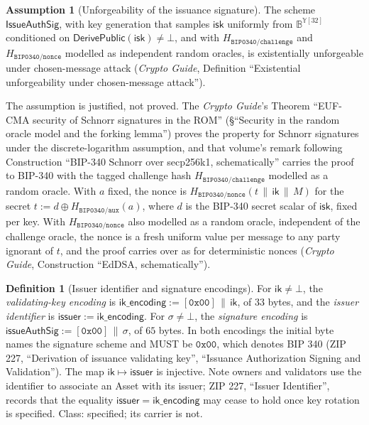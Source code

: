 \documentclass[11pt,a4paper]{article}
\theoremstyle{definition}
\newtheorem{definition}[theorem]{Definition}
\newtheorem{assumption}[theorem]{Assumption}
\begin{document}
\begin{assumption}[Unforgeability of the issuance signature]
\label{ass:issueauthsig-euf}
The scheme $\mathsf{IssueAuthSig}$, with key generation that samples
$\mathsf{isk}$ uniformly from $\mathbb{B}^{\mathbb{Y}[32]}$ conditioned on
$\mathsf{DerivePublic}(\mathsf{isk}) \neq \bot$, and with
$H_{\mathtt{BIP0340/challenge}}$ and $H_{\mathtt{BIP0340/nonce}}$ modelled
as independent random oracles, is existentially unforgeable under chosen-message
attack (\emph{Crypto Guide}, Definition
``Existential unforgeability under chosen-message attack'').
\end{assumption}

The assumption is justified, not proved. The \emph{Crypto Guide}'s Theorem
``EUF-CMA security of Schnorr signatures in the ROM'' (\S``Security in the
random oracle model and the forking lemma'') proves the property for Schnorr
signatures under the discrete-logarithm assumption, and that volume's remark
following Construction ``BIP-340 Schnorr over secp256k1, schematically''
carries the proof to BIP-340 with the tagged challenge hash
$H_{\mathtt{BIP0340/challenge}}$ modelled as a random oracle. With $a$ fixed,
the nonce is $H_{\mathtt{BIP0340/nonce}}(t \,\|\, \mathsf{ik} \,\|\, M)$ for
the secret $t := d \oplus H_{\mathtt{BIP0340/aux}}(a)$, where $d$ is the
BIP-340 secret scalar of $\mathsf{isk}$, fixed per key. With
$H_{\mathtt{BIP0340/nonce}}$ also modelled as a random oracle, independent
of the challenge oracle, the nonce is a fresh uniform value per message to
any party ignorant of $t$, and the proof carries over as for deterministic
nonces (\emph{Crypto Guide}, Construction ``EdDSA, schematically'').

\begin{definition}[Issuer identifier and signature encodings]
\label{def:issuer}
For $\mathsf{ik} \neq \bot$, the \emph{validating-key encoding} is
$\mathsf{ik\_encoding} := [\mathtt{0x00}] \,\|\, \mathsf{ik}$, of $33$ bytes,
and the \emph{issuer identifier} is
$\mathsf{issuer} := \mathsf{ik\_encoding}$. For $\sigma \neq \bot$, the
\emph{signature encoding} is
$\mathsf{issueAuthSig} := [\mathtt{0x00}] \,\|\, \sigma$, of $65$ bytes. In
both encodings the initial byte names the signature scheme and MUST be
$\mathtt{0x00}$, which denotes BIP 340 (ZIP 227, ``Derivation of issuance
validating key'', ``Issuance Authorization Signing and Validation''). The
map $\mathsf{ik} \mapsto \mathsf{issuer}$ is injective. Note owners and
validators use the identifier to associate an Asset with its issuer; ZIP
227, ``Issuer Identifier'', records that the equality
$\mathsf{issuer} = \mathsf{ik\_encoding}$ may cease to hold once key
rotation is specified. Class: specified; its carrier is not.
\end{definition}
\end{document}
